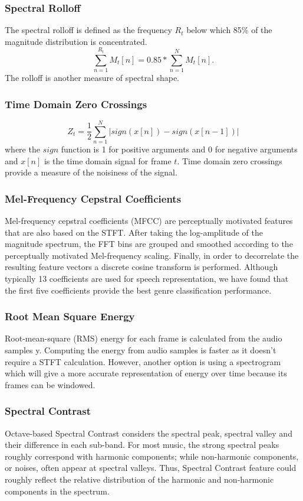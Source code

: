\documentclass[a4paper,10pt]{article}
\begin{document}
\subsubsection{Spectral Rolloff}
The spectral rolloff is defined as the frequency $R_{t}$ below which 85\% of the magnitude distribution is concentrated.
$$ \sum_{n=1}^{R_{t}}M_{t}[n] = 0.85 * \sum_{n=1}^{N}M_{t}[n]. $$
The rolloff is another measure of spectral shape.

\subsubsection{Time Domain Zero Crossings}
$$Z_{t} = \frac{1}{2}\sum_{n=1}^{N}|sign(x[n])-sign(x[n-1])|$$
where the $sign$ function is 1 for positive arguments and 0 for negative arguments and $x[n]$ is the time domain signal for frame $t$. Time domain zero crossings provide a measure of the noisiness of the signal.

\subsubsection{Mel-Frequency Cepstral Coefficients}
Mel-frequency cepstral coefficients (MFCC) are perceptually motivated features that are also based on the STFT. After taking the log-amplitude of the magnitude spectrum, the FFT bins are grouped and smoothed according to the perceptually motivated Mel-frequency scaling. Finally, in order to decorrelate the resulting feature vectors a discrete cosine transform is performed. Although typically 13 coefficients are used for speech representation, we have found that the first five coefficients provide the best genre classification performance.

\subsubsection{Root Mean Square Energy}
 Root-mean-square (RMS) energy for each frame is calculated from the audio samples y.  Computing the energy from audio samples is faster as it doesn’t require a STFT calculation.  However, another option is using a spectrogram  which will give a more accurate representation of energy over time because its frames can be windowed.

\subsubsection{Spectral Contrast}
Octave-based Spectral Contrast considers the spectral peak, spectral valley and their difference in each sub-band. For most music, the strong spectral peaks roughly correspond with harmonic components; while non-harmonic components, or noises, often appear at spectral valleys. Thus, Spectral Contrast feature could roughly reflect the relative distribution of the harmonic and non-harmonic components in the spectrum. 
\end{document}
